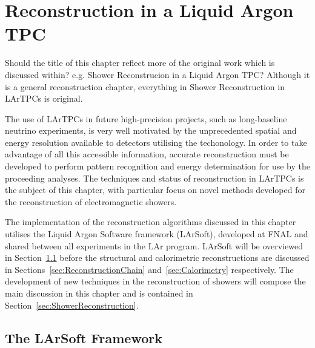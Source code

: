 
\graphicspath{{LArTPCReconstruction/Figs/}}

\chapter{Reconstruction in a Liquid Argon TPC}\label{chap:LArTPCReconstruction}

{\color{red} Should the title of this chapter reflect more of the original work which is discussed within?  e.g. Shower Reconstrucion in a Liquid Argon TPC?  Although  it is a general reconstruction chapter, everything in Shower Reconstruction in LArTPCs is original.}

The use of LArTPCs in future high-precision projects, such as long-baseline neutrino experiments, is very well motivated by the unprecedented spatial and energy resolution available to detectors utilising the techonology.  In order to take advantage of all this accessible information, accurate reconstruction must be developed to perform pattern recognition and energy determination for use by the proceeding analyses.  The techniques and status of reconstruction in LArTPCs is the subject of this chapter, with particular focus on novel methods developed for the reconstruction of electromagnetic showers.

The implementation of the reconstruction algorithms discussed in this chapter utilises the Liquid Argon Software framework (LArSoft), developed at FNAL and shared between all experiments in the LAr program.  LArSoft will be overviewed in Section~\ref{sec:LArSoft} before the structural and calorimetric reconstructions are discussed in Sections~\ref{sec:ReconstructionChain} and~\ref{sec:Calorimetry} respectively.  The development of new techniques in the reconstruction of showers will compose the main discussion in this chapter and is contained in Section~\ref{sec:ShowerReconstruction}.

\section{The LArSoft Framework}\label{sec:LArSoft}

